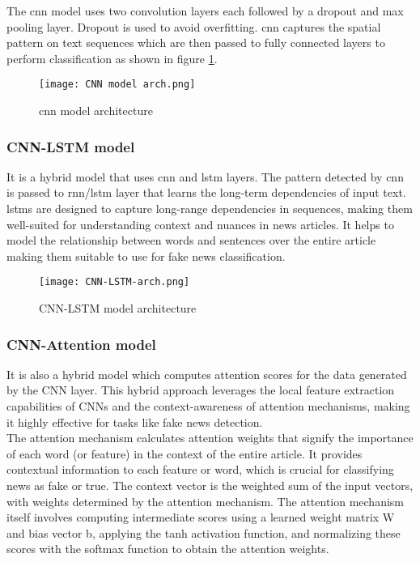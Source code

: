     The \ac{cnn} model uses two convolution layers each followed by a dropout and max pooling layer. Dropout is used to avoid overfitting. \ac{cnn} captures the spatial pattern on text sequences which are then passed to fully connected layers to perform classification as shown in figure \ref{fig:cnn_model_architecture}. 

    \begin{figure}[h]
        \centering
        \texttt{[image: CNN model arch.png]}
        \caption{\ac{cnn} model architecture}
        \label{fig:cnn_model_architecture}
    \end{figure}

    \clearpage
    
    \subsubsection{CNN-LSTM model}
    It is a hybrid model that uses \ac{cnn} and \ac{lstm} layers. The pattern detected by \ac{cnn} is passed to \ac{rnn}/\ac{lstm} layer that learns the long-term dependencies of input text. \\

    \ac{lstm}s are designed to capture long-range dependencies in sequences, making them well-suited for understanding context and nuances in news articles. It helps to model the relationship between words and sentences over the entire article making them suitable to use for fake news classification.
    
    \begin{figure}[h]
        \centering
        \texttt{[image: CNN-LSTM-arch.png]}
        \caption{CNN-LSTM model architecture}
        \label{fig:cnn-lstm-model-arch}
    \end{figure}

    \clearpage
    \subsubsection{CNN-Attention model}
    It is also a hybrid model which computes attention scores for the data generated by the CNN layer. This hybrid approach leverages the local feature extraction capabilities of CNNs and the context-awareness of attention mechanisms, making it highly effective for tasks like fake news detection.\\

    The attention mechanism calculates attention weights that signify the importance of each word (or feature) in the context of the entire article. It provides contextual information to each feature or word, which is crucial for classifying news as fake or true. The context vector is the weighted sum of the input vectors, with weights determined by the attention mechanism. The attention mechanism itself involves computing intermediate scores using a learned weight matrix W and bias vector b, applying the tanh activation function, and normalizing these scores with the softmax function to obtain the attention weights.

